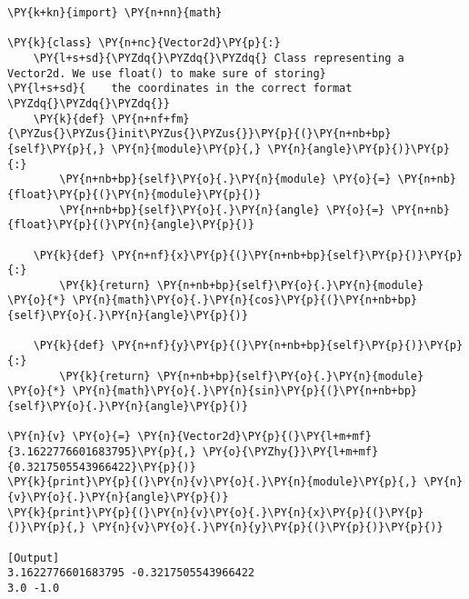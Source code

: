 \begin{Verbatim}[label=\makebox{\url{https://github.com/lucabaldini/cmepda/tree/master/slides/latex/snippets/vector2d\_rtheta.py}},commandchars=\\\{\}]
\PY{k+kn}{import} \PY{n+nn}{math}

\PY{k}{class} \PY{n+nc}{Vector2d}\PY{p}{:}
    \PY{l+s+sd}{\PYZdq{}\PYZdq{}\PYZdq{} Class representing a Vector2d. We use float() to make sure of storing}
\PY{l+s+sd}{    the coordinates in the correct format \PYZdq{}\PYZdq{}\PYZdq{}}   
    \PY{k}{def} \PY{n+nf+fm}{\PYZus{}\PYZus{}init\PYZus{}\PYZus{}}\PY{p}{(}\PY{n+nb+bp}{self}\PY{p}{,} \PY{n}{module}\PY{p}{,} \PY{n}{angle}\PY{p}{)}\PY{p}{:}
        \PY{n+nb+bp}{self}\PY{o}{.}\PY{n}{module} \PY{o}{=} \PY{n+nb}{float}\PY{p}{(}\PY{n}{module}\PY{p}{)}
        \PY{n+nb+bp}{self}\PY{o}{.}\PY{n}{angle} \PY{o}{=} \PY{n+nb}{float}\PY{p}{(}\PY{n}{angle}\PY{p}{)}
   
    \PY{k}{def} \PY{n+nf}{x}\PY{p}{(}\PY{n+nb+bp}{self}\PY{p}{)}\PY{p}{:}
        \PY{k}{return} \PY{n+nb+bp}{self}\PY{o}{.}\PY{n}{module} \PY{o}{*} \PY{n}{math}\PY{o}{.}\PY{n}{cos}\PY{p}{(}\PY{n+nb+bp}{self}\PY{o}{.}\PY{n}{angle}\PY{p}{)}
       
    \PY{k}{def} \PY{n+nf}{y}\PY{p}{(}\PY{n+nb+bp}{self}\PY{p}{)}\PY{p}{:}
        \PY{k}{return} \PY{n+nb+bp}{self}\PY{o}{.}\PY{n}{module} \PY{o}{*} \PY{n}{math}\PY{o}{.}\PY{n}{sin}\PY{p}{(}\PY{n+nb+bp}{self}\PY{o}{.}\PY{n}{angle}\PY{p}{)}
  
\PY{n}{v} \PY{o}{=} \PY{n}{Vector2d}\PY{p}{(}\PY{l+m+mf}{3.1622776601683795}\PY{p}{,} \PY{o}{\PYZhy{}}\PY{l+m+mf}{0.3217505543966422}\PY{p}{)}
\PY{k}{print}\PY{p}{(}\PY{n}{v}\PY{o}{.}\PY{n}{module}\PY{p}{,} \PY{n}{v}\PY{o}{.}\PY{n}{angle}\PY{p}{)}
\PY{k}{print}\PY{p}{(}\PY{n}{v}\PY{o}{.}\PY{n}{x}\PY{p}{(}\PY{p}{)}\PY{p}{,} \PY{n}{v}\PY{o}{.}\PY{n}{y}\PY{p}{(}\PY{p}{)}\PY{p}{)}

[Output]
3.1622776601683795 -0.3217505543966422
3.0 -1.0
\end{Verbatim}